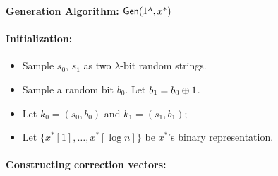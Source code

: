 \begin{figure}
    
    \begin{minipage}{\textwidth}
        \begin{mdframed}
            \begin{center}
                \textbf{Generation Algorithm:} ${\sf Gen}(1^\lambda, x^*)$
            \end{center}
            
            \paragraph{Initialization:} 
            \begin{itemize}
                \item Sample $s_0$, $s_1$ as two $\lambda$-bit random strings. 
                \item Sample a random bit $b_0$. Let $b_1=b_0\oplus 1$.
                \item Let $k_0 = (s_0, b_0)$ and $k_1=(s_1,b_1)$;
                \item Let $\{x^*[1],\dots,x^*[\log n]\}$ be $x^*$'s binary representation. 
            \end{itemize}
            
            
            \paragraph{Constructing correction vectors:} 
            

\end{mdframed}
\end{minipage}
\end{figure}
